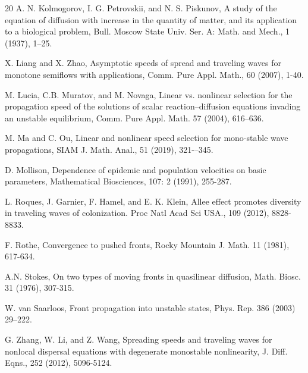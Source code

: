 \documentclass[11pt,a4paper]{article}
\numberwithin{equation}{section}
\numberwithin{figure}{section}
\begin{document}
\begin{thebibliography}{20}
{A. N. Kolmogorov, I. G. Petrovskii, and N. S. Piskunov},
A study of the equation of diffusion with increase in the quantity of matter, and its application to a biological problem,
Bull. Moscow State Univ. Ser. A: Math. and Mech., 1 (1937), 1--25.



{X. Liang and X. Zhao}, Asymptotic speeds of spread and traveling waves for monotone
semiflows with applications, Comm. Pure Appl. Math., 60 (2007), 1-40.



{M. Lucia, C.B. Muratov, and M. Novaga},
Linear vs. nonlinear selection for the propagation speed of the solutions of scalar reaction–diffusion
equations invading an unstable equilibrium, Comm. Pure Appl. Math. 57 (2004), 616–636.





{M. Ma and C. Ou},
Linear and nonlinear speed selection for mono-stable wave propagations, SIAM J. Math. Anal., 51 (2019), 321-–345.

{D. Mollison},
Dependence of epidemic and population velocities on basic parameters,
Mathematical Biosciences,
107: 2 (1991), 255-287.



{L. Roques, J. Garnier, F. Hamel, and E. K. Klein},
Allee effect promotes diversity in traveling waves of colonization. Proc Natl Acad Sci USA., 109 (2012), 8828-8833.


{F. Rothe},
Convergence to pushed fronts, Rocky Mountain J. Math. 11 (1981), 617-634.

{A.N. Stokes}, On two types of moving fronts in quasilinear diffusion, Math. Biosc.
31 (1976), 307-315.




{W. van Saarloos},
Front propagation into unstable states, Phys. Rep. 386 (2003) 29–222.



{G. Zhang, W. Li, and Z. Wang},
Spreading speeds and traveling waves for nonlocal dispersal equations with degenerate monostable nonlinearity,
J. Diff. Eqns., 252 (2012), 5096-5124.

\end{thebibliography}
\end{document}
